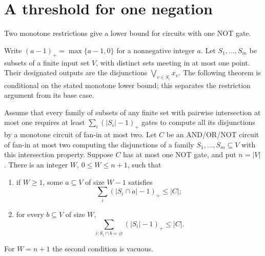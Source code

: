 \section{A threshold for one negation}
Two monotone restrictions give a lower bound for circuits with one NOT gate.

Write \mbox{$(a-1)_+=\max\{a-1,0\}$} for a nonnegative integer $a$.
Let $S_1,\ldots,S_m$ be subsets of a finite input set $V$, with distinct sets meeting in at most one point. Their designated outputs are the disjunctions $\bigvee_{v\in S_i}x_v$.
The following theorem is conditional on the stated monotone lower bound; this separates the restriction argument from its base case.

\begin{theorem}\label{thm:one-not-threshold}
Assume that every family of subsets of any finite set with pairwise intersection at most one requires at least
$\sum_i(|S_i|-1)_+$ gates to compute all its disjunctions by a monotone circuit of fan-in at most two.
Let $C$ be an AND/OR/NOT circuit of fan-in at most two computing the disjunctions of a family $S_1,\ldots,S_m\subseteq V$ with this intersection property. Suppose $C$ has at most one NOT gate, and put $n=|V|$.
There is an integer $W$, $0\leq W\leq n+1$, such that
\begin{enumerate}
\item if $W\geq1$, some $a\subseteq V$ of size $W-1$ satisfies
\[
 \sum_i(|S_i\cap a|-1)_+\leq |C|;
\]
\item for every $b\subseteq V$ of size $W$,
\[
 \sum_{i:S_i\cap b=\varnothing}(|S_i|-1)_+\leq |C|.
\]
\end{enumerate}
For $W=n+1$ the second condition is vacuous.
\end{theorem}

